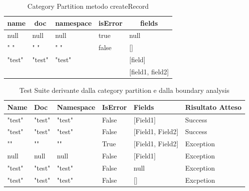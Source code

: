 \documentclass[10pt, a4paper]{article}
\begin{document}
\begin{table}[ht]
  \centering
  \caption[Schema - Category Partition]{Category Partition metodo createRecord}
  \begin{tabular}{|l|l|l|l|l|}
  \hline
  \multicolumn{1}{|c|}{\textbf{name}} & \multicolumn{1}{|c|}{\textbf{doc}} & \multicolumn{1}{|c|}{\textbf{namespace}} & 
  \multicolumn{1}{|c|}{\textbf{isError}} & \multicolumn{1}{|c|}{\textbf{fields}} \\
  \hline
  null & null & null & true & null \\
  \hdashline[4pt/2pt]
  " " & " " & " " & false & [] \\
  \hdashline[4pt/2pt]
  "test" & "test" & "test" & & [field] \\
  \hdashline[4pt/2pt]
  & & & & [field1, field2] \\
  \hline
  \end{tabular}
  \label{tab:BoundaryAnalysisCreateRecord}
\end{table}

\begin{table}[ht]
  \centering
  \caption[CreateRecord: Test Suite - Category partition]{Test Suite derivante dalla category partition e dalla boundary analysis}
  \begin{tabular}{|l|l|l|l|l|l|}
    \hline
    \textbf{Name} & \textbf{Doc} & \textbf{Namespace}  & \textbf{IsError} & \textbf{Fields} & \textbf{Risultato Atteso} \\
    \hline
    "test" & "test" & "test" & False & [Field1] & Success \\
    "test" & "test" & "test" & False & [Field1, Field2] & Success \\
    "" & "" & "" & True & [Field1, Field2] & Exception \\
    null & null & null & False & [Field1] & Exception \\
    "test" & "test" & "test" & False & null & Exception \\
    "test" & "test" & "test" & False & [] & Excpetion \\

    \hline
  \end{tabular}
  \label{tab:categoryPartition1CreateRecord}
\end{table}
\end{document}
